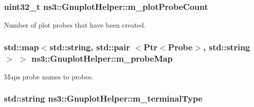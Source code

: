 \subsubsection[{\texorpdfstring{m\+\_\+plot\+Probe\+Count}{m_plotProbeCount}}]{\setlength{\rightskip}{0pt plus 5cm}uint32\+\_\+t ns3\+::\+Gnuplot\+Helper\+::m\+\_\+plot\+Probe\+Count\hspace{0.3cm}{\ttfamily [private]}}\hypertarget{classns3_1_1GnuplotHelper_ab674c88bf8c395e601007ecb39b65dbf}{}\label{classns3_1_1GnuplotHelper_ab674c88bf8c395e601007ecb39b65dbf}


Number of plot probes that have been created. 

\subsubsection[{\texorpdfstring{m\+\_\+probe\+Map}{m_probeMap}}]{\setlength{\rightskip}{0pt plus 5cm}std\+::map$<$std\+::string, std\+::pair $<${\bf Ptr}$<${\bf Probe}$>$, std\+::string$>$ $>$ ns3\+::\+Gnuplot\+Helper\+::m\+\_\+probe\+Map\hspace{0.3cm}{\ttfamily [private]}}\hypertarget{classns3_1_1GnuplotHelper_aa4e50b82ac09e3ec99c1881f37f12ca5}{}\label{classns3_1_1GnuplotHelper_aa4e50b82ac09e3ec99c1881f37f12ca5}


Maps probe names to probes. 

\subsubsection[{\texorpdfstring{m\+\_\+terminal\+Type}{m_terminalType}}]{\setlength{\rightskip}{0pt plus 5cm}std\+::string ns3\+::\+Gnuplot\+Helper\+::m\+\_\+terminal\+Type\hspace{0.3cm}{\ttfamily [private]}}\hypertarget{classns3_1_1GnuplotHelper_a9a0989d2b61fd4d10dac8615f7292886}{}\label{classns3_1_1GnuplotHelper_a9a0989d2b61fd4d10dac8615f7292886}


